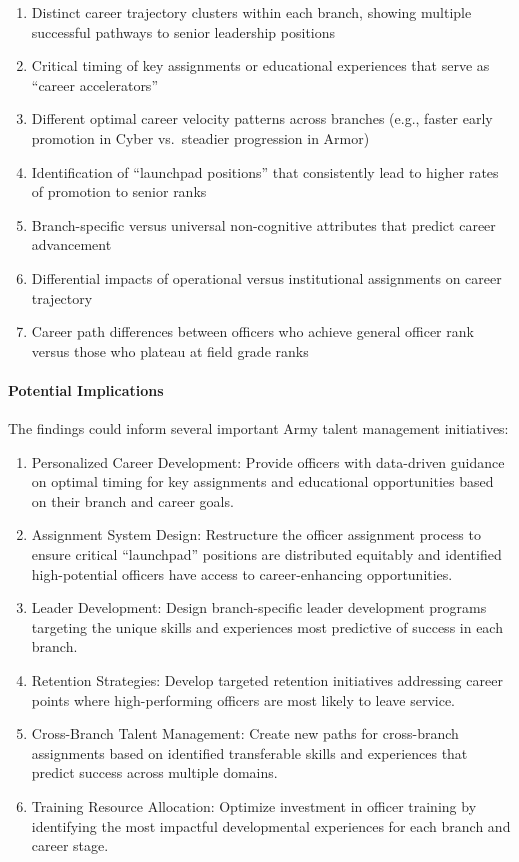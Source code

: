 \documentclass[./main.tex]{subfiles}
\begin{document}
\begin{enumerate}
\def\labelenumi{\arabic{enumi}.}
\tightlist
\item
  Distinct career trajectory clusters within each branch, showing
  multiple successful pathways to senior leadership positions
\item
  Critical timing of key assignments or educational experiences that
  serve as ``career accelerators''
\item
  Different optimal career velocity patterns across branches (e.g.,
  faster early promotion in Cyber vs.~steadier progression in Armor)
\item
  Identification of ``launchpad positions'' that consistently lead to
  higher rates of promotion to senior ranks
\item
  Branch-specific versus universal non-cognitive attributes that predict
  career advancement
\item
  Differential impacts of operational versus institutional assignments
  on career trajectory
\item
  Career path differences between officers who achieve general officer
  rank versus those who plateau at field grade ranks
\end{enumerate}

\paragraph{Potential Implications}\label{potential-implications}

The findings could inform several important Army talent management
initiatives:

\begin{enumerate}
\def\labelenumi{\arabic{enumi}.}
\item
  Personalized Career Development: Provide officers with data-driven
  guidance on optimal timing for key assignments and educational
  opportunities based on their branch and career goals.
\item
  Assignment System Design: Restructure the officer assignment process
  to ensure critical ``launchpad'' positions are distributed equitably
  and identified high-potential officers have access to career-enhancing
  opportunities.
\item
  Leader Development: Design branch-specific leader development programs
  targeting the unique skills and experiences most predictive of success
  in each branch.
\item
  Retention Strategies: Develop targeted retention initiatives
  addressing career points where high-performing officers are most
  likely to leave service.
\item
  Cross-Branch Talent Management: Create new paths for cross-branch
  assignments based on identified transferable skills and experiences
  that predict success across multiple domains.
\item
  Training Resource Allocation: Optimize investment in officer training
  by identifying the most impactful developmental experiences for each
  branch and career stage.
\end{enumerate}
\end{document}
